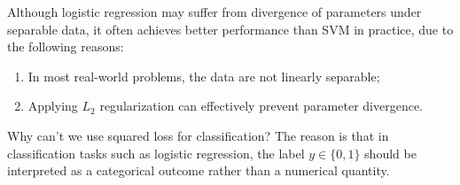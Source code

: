 \documentclass[../main]{subfiles}
\begin{document}
Although logistic regression may suffer from divergence of parameters under separable data, it often achieves better performance than SVM in practice, due to the following reasons:
\begin{enumerate}
  \item In most real-world problems, the data are not linearly separable;
  \item Applying $L_2$ regularization can effectively prevent parameter divergence.
\end{enumerate}
\begin{remark}
  Why can't we use squared loss for classification? The reason is that in classification tasks such as logistic regression, the label $y \in \{0,1\}$ should be interpreted as a categorical outcome rather than a numerical quantity. 
\end{remark}
\end{document}
